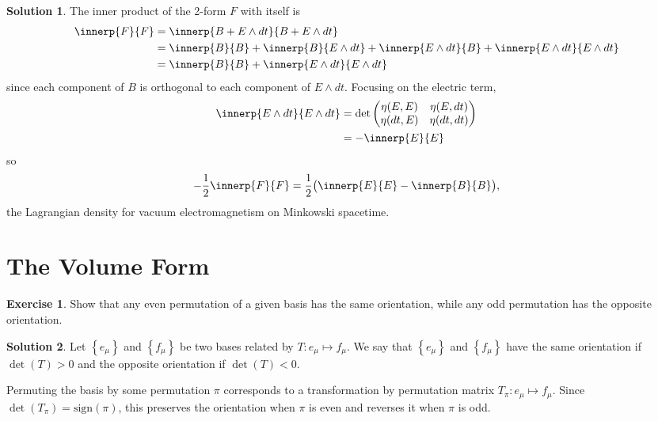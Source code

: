 \documentclass[11pt, a4paper]{report}
\theoremstyle{definition}
\newtheorem{exercise}{Exercise}[part]
\newtheorem{solution}{Solution}[part]
\newenvironment{ex}{\begin{exercise}}{\end{exercise}\pagebreak[1]}
\newenvironment{sol}{\begin{solution}}{\end{solution}\pagebreak[3]}
\begin{document}
\begin{sol}

The inner product of the 2-form $F$ with itself is
\begin{align*}
    \innerp{F}{F} &= \innerp{B + E \wedge dt}{B + E \wedge dt} \\
        &= \innerp{B}{B} + \innerp{B}{E \wedge dt} + \innerp{E \wedge dt}{B} + \innerp{E \wedge dt}{E \wedge dt} \\
        &= \innerp{B}{B} + \innerp{E \wedge dt}{E \wedge dt}
\end{align*}
since each component of $B$ is orthogonal to each component of $E \wedge dt$.
Focusing on the electric term,
\begin{align*}
    \innerp{E \wedge dt}{E \wedge dt} &= \det \begin{pmatrix}
                \eta(E, E) & \eta(E, dt) \\
                \eta(dt, E) & \eta(dt, dt)
            \end{pmatrix} \\
        &= -\innerp{E}{E}
\end{align*}
so
\[
    -\frac{1}{2} \innerp{F}{F} = \frac{1}{2} \bigl( \innerp{E}{E} - \innerp{B}{B} \bigr),
\]
the Lagrangian density for vacuum electromagnetism on Minkowski spacetime.

\end{sol}

\section{The Volume Form}

\begin{ex}

Show that any even permutation of a given basis has the same orientation, while any odd permutation has the opposite orientation.

\end{ex}

\begin{sol}

Let $\left\{e_\mu\right\}$ and $\left\{f_\mu\right\}$ be two bases related by $T: e_\mu \mapsto f_\mu$. We say that $\left\{e_\mu\right\}$ and $\left\{f_\mu\right\}$ have the same orientation if $\det(T) > 0$ and the opposite orientation if $\det(T) < 0$.

Permuting the basis by some permutation $\pi$ corresponds to a transformation by permutation matrix $T_\pi: e_\mu \mapsto f_\mu$. Since $\det(T_\pi) = \text{sign}(\pi)$, this preserves the orientation when $\pi$ is even and reverses it when $\pi$ is odd.

\end{sol}
\end{document}
